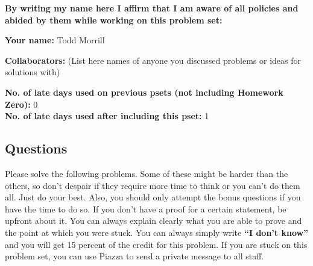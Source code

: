 \documentclass[11pt]{article}
\begin{document}
	\textbf{By writing my name here I affirm that I am aware of all policies
		and abided by them while working on this problem set:}
	
	\textbf{Your name:} Todd Morrill
	
	\textbf{Collaborators:} (List here names of anyone you discussed
	problems or ideas for solutions with)
	
	\textbf{No. of late days used on previous psets (not including Homework Zero): }0\\
	\textbf{No. of late days used after including this pset: } 1
	
	
	\newpage
	
	\subsection*{Questions}\label{questions}
	
Please solve the following problems. Some of these might be harder than
the others, so don't despair if they require more time to think or you
can't do them all. Just do your best. Also, you should only attempt the
bonus questions if you have the time to do so. If you don't have a proof
for a certain statement, be upfront about it. You can always explain
clearly what you are able to prove and the point at which you were
stuck. 
You can always simply write
\textbf{``I don't know''} and you will get 15 percent of the credit for
this problem. If you are stuck on this problem set, you can use Piazza to
send a private message to all staff.

\end{document}
